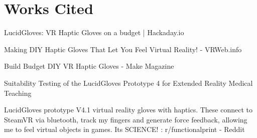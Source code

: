 \documentclass{article}
\begin{document}
\section*{Works Cited}
\begin{thebibliography}{9}
     \begin{minipage}[c]{0.15\textwidth}\end{minipage}\begin{minipage}[c]{0.8\textwidth}LucidGloves: VR Haptic Gloves on a budget | Hackaday.io\end{minipage}
     \begin{minipage}[c]{0.15\textwidth}\end{minipage}\begin{minipage}[c]{0.8\textwidth}Making DIY Haptic Gloves That Let You Feel Virtual Reality! - VRWeb.info\end{minipage}
     \begin{minipage}[c]{0.15\textwidth}\end{minipage}\begin{minipage}[c]{0.8\textwidth}Build Budget DIY VR Haptic Gloves - Make Magazine\end{minipage}
     \begin{minipage}[c]{0.15\textwidth}\end{minipage}\begin{minipage}[c]{0.8\textwidth}Suitability Testing of the LucidGloves Prototype 4 for Extended Reality Medical Teaching\end{minipage}
     \begin{minipage}[c]{0.15\textwidth}\end{minipage}\begin{minipage}[c]{0.8\textwidth}LucidGloves prototype V4.1 virtual reality gloves with haptics. These connect to SteamVR via bluetooth, track my fingers and generate force feedback, allowing me to feel virtual objects in games. Its SCIENCE! : r/functionalprint - Reddit\end{minipage}

\end{thebibliography}
\end{document}
